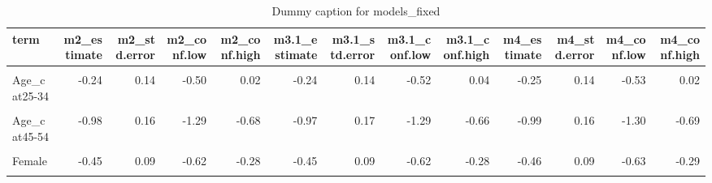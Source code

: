 \begin{table}
\centering
\caption{Dummy caption for models_fixed}
\centering
\fontsize{10}{12}\selectfont
\begin{tabular}[t]{lrrrrrrrrrrrr}
\toprule
term & m2\_estimate & m2\_std.error & m2\_conf.low & m2\_conf.high & m3.1\_estimate & m3.1\_std.error & m3.1\_conf.low & m3.1\_conf.high & m4\_estimate & m4\_std.error & m4\_conf.low & m4\_conf.high\\
\midrule
\cellcolor{gray!10}{(Intercept)} & \cellcolor{gray!10}{-2.58} & \cellcolor{gray!10}{0.80} & \cellcolor{gray!10}{-4.29} & \cellcolor{gray!10}{-0.77} & \cellcolor{gray!10}{-2.65} & \cellcolor{gray!10}{0.51} & \cellcolor{gray!10}{-3.69} & \cellcolor{gray!10}{-1.49} & \cellcolor{gray!10}{-2.84} & \cellcolor{gray!10}{0.66} & \cellcolor{gray!10}{-4.25} & \cellcolor{gray!10}{-1.46}\\
Age\_cat25-34 & -0.24 & 0.14 & -0.50 & 0.02 & -0.24 & 0.14 & -0.52 & 0.04 & -0.25 & 0.14 & -0.53 & 0.02\\
\cellcolor{gray!10}{Age\_cat35-44} & \cellcolor{gray!10}{-0.87} & \cellcolor{gray!10}{0.15} & \cellcolor{gray!10}{-1.18} & \cellcolor{gray!10}{-0.57} & \cellcolor{gray!10}{-0.87} & \cellcolor{gray!10}{0.15} & \cellcolor{gray!10}{-1.18} & \cellcolor{gray!10}{-0.56} & \cellcolor{gray!10}{-0.89} & \cellcolor{gray!10}{0.15} & \cellcolor{gray!10}{-1.21} & \cellcolor{gray!10}{-0.58}\\
Age\_cat45-54 & -0.98 & 0.16 & -1.29 & -0.68 & -0.97 & 0.17 & -1.29 & -0.66 & -0.99 & 0.16 & -1.30 & -0.69\\
\cellcolor{gray!10}{Age\_cat55+} & \cellcolor{gray!10}{-0.79} & \cellcolor{gray!10}{0.13} & \cellcolor{gray!10}{-1.03} & \cellcolor{gray!10}{-0.54} & \cellcolor{gray!10}{-0.79} & \cellcolor{gray!10}{0.13} & \cellcolor{gray!10}{-1.04} & \cellcolor{gray!10}{-0.53} & \cellcolor{gray!10}{-0.77} & \cellcolor{gray!10}{0.13} & \cellcolor{gray!10}{-1.02} & \cellcolor{gray!10}{-0.52}\\
Female & -0.45 & 0.09 & -0.62 & -0.28 & -0.45 & 0.09 & -0.62 & -0.28 & -0.46 & 0.09 & -0.63 & -0.29\\
\cellcolor{gray!10}{Incomequintile 2} & \cellcolor{gray!10}{-0.01} & \cellcolor{gray!10}{0.15} & \cellcolor{gray!10}{-0.30} & \cellcolor{gray!10}{0.27} & \cellcolor{gray!10}{-0.01} & \cellcolor{gray!10}{0.15} & \cellcolor{gray!10}{-0.29} & \cellcolor{gray!10}{0.28} & \cellcolor{gray!10}{-0.07} & \cellcolor{gray!10}{0.63} & \cellcolor{gray!10}{-1.29} & \cellcolor{gray!10}{1.19}\\

\end{tabular}
\end{table}
